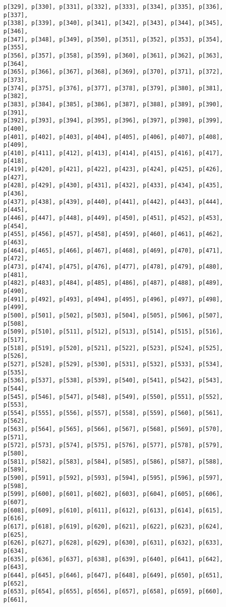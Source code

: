 \documentclass[
  letterpaper,
  DIV=11,
  numbers=noendperiod]{scrartcl}
\begin{document}
\begin{verbatim}
p[329], p[330], p[331], p[332], p[333], p[334], p[335], p[336], p[337],
p[338], p[339], p[340], p[341], p[342], p[343], p[344], p[345], p[346],
p[347], p[348], p[349], p[350], p[351], p[352], p[353], p[354], p[355],
p[356], p[357], p[358], p[359], p[360], p[361], p[362], p[363], p[364],
p[365], p[366], p[367], p[368], p[369], p[370], p[371], p[372], p[373],
p[374], p[375], p[376], p[377], p[378], p[379], p[380], p[381], p[382],
p[383], p[384], p[385], p[386], p[387], p[388], p[389], p[390], p[391],
p[392], p[393], p[394], p[395], p[396], p[397], p[398], p[399], p[400],
p[401], p[402], p[403], p[404], p[405], p[406], p[407], p[408], p[409],
p[410], p[411], p[412], p[413], p[414], p[415], p[416], p[417], p[418],
p[419], p[420], p[421], p[422], p[423], p[424], p[425], p[426], p[427],
p[428], p[429], p[430], p[431], p[432], p[433], p[434], p[435], p[436],
p[437], p[438], p[439], p[440], p[441], p[442], p[443], p[444], p[445],
p[446], p[447], p[448], p[449], p[450], p[451], p[452], p[453], p[454],
p[455], p[456], p[457], p[458], p[459], p[460], p[461], p[462], p[463],
p[464], p[465], p[466], p[467], p[468], p[469], p[470], p[471], p[472],
p[473], p[474], p[475], p[476], p[477], p[478], p[479], p[480], p[481],
p[482], p[483], p[484], p[485], p[486], p[487], p[488], p[489], p[490],
p[491], p[492], p[493], p[494], p[495], p[496], p[497], p[498], p[499],
p[500], p[501], p[502], p[503], p[504], p[505], p[506], p[507], p[508],
p[509], p[510], p[511], p[512], p[513], p[514], p[515], p[516], p[517],
p[518], p[519], p[520], p[521], p[522], p[523], p[524], p[525], p[526],
p[527], p[528], p[529], p[530], p[531], p[532], p[533], p[534], p[535],
p[536], p[537], p[538], p[539], p[540], p[541], p[542], p[543], p[544],
p[545], p[546], p[547], p[548], p[549], p[550], p[551], p[552], p[553],
p[554], p[555], p[556], p[557], p[558], p[559], p[560], p[561], p[562],
p[563], p[564], p[565], p[566], p[567], p[568], p[569], p[570], p[571],
p[572], p[573], p[574], p[575], p[576], p[577], p[578], p[579], p[580],
p[581], p[582], p[583], p[584], p[585], p[586], p[587], p[588], p[589],
p[590], p[591], p[592], p[593], p[594], p[595], p[596], p[597], p[598],
p[599], p[600], p[601], p[602], p[603], p[604], p[605], p[606], p[607],
p[608], p[609], p[610], p[611], p[612], p[613], p[614], p[615], p[616],
p[617], p[618], p[619], p[620], p[621], p[622], p[623], p[624], p[625],
p[626], p[627], p[628], p[629], p[630], p[631], p[632], p[633], p[634],
p[635], p[636], p[637], p[638], p[639], p[640], p[641], p[642], p[643],
p[644], p[645], p[646], p[647], p[648], p[649], p[650], p[651], p[652],
p[653], p[654], p[655], p[656], p[657], p[658], p[659], p[660], p[661],

\end{verbatim}
\end{document}
